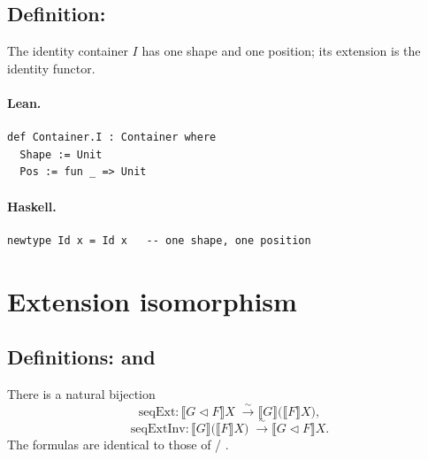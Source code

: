 \documentclass[11pt,a4paper]{article}
\begin{document}
\subsection{Definition: }

\begin{defn}
The identity container $I$ has one shape and one position; its extension is
the identity functor.
\end{defn}

\paragraph{Lean.}
\begin{lstlisting}[style=lean]
def Container.I : Container where
  Shape := Unit
  Pos := fun _ => Unit
\end{lstlisting}

\paragraph{Haskell.}
\begin{lstlisting}[style=haskell]
newtype Id x = Id x   -- one shape, one position
\end{lstlisting}

\section{Extension isomorphism}

\subsection{Definitions:  and }

\begin{defn}
There is a natural bijection
\[
  \mathrm{seqExt} : \llbracket G \triangleleft F \rrbracket X \;\xrightarrow{\;\sim\;}
  \llbracket G \rrbracket\bigl(\llbracket F \rrbracket X\bigr),
\]
\[
  \mathrm{seqExtInv} : \llbracket G \rrbracket\bigl(\llbracket F \rrbracket X\bigr)
  \;\xrightarrow{\;\sim\;} \llbracket G \triangleleft F \rrbracket X.
\]
The formulas are identical to those of  / .
\end{defn}
\end{document}
